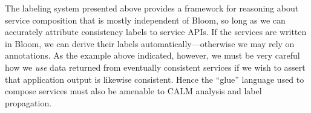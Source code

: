 
% 
% 

The labeling system presented above provides a framework for reasoning about service composition that is 
mostly independent of Bloom, so long as we can accurately attribute consistency labels to service APIs.
If the services are written in Bloom, we can derive their labels automatically---otherwise we may rely on annotations.
As the example above indicated, however, we must be very careful how we \emph{use} data returned from 
eventually consistent services
if we wish to assert that application output is likewise consistent.  Hence the ``glue'' language used
to compose services must also be amenable to CALM analysis and label propagation.

